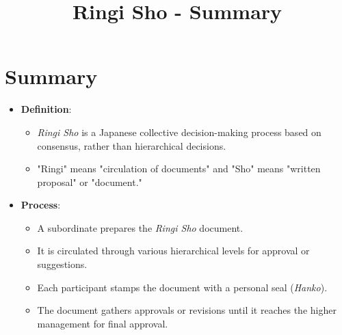 \documentclass{article}
\begin{document}
\title{Ringi Sho - Summary}
\author{}
\date{}

\maketitle

\section*{Summary}

\begin{itemize}
    \item \textbf{Definition}:
    \begin{itemize}
        \item \textit{Ringi Sho} is a Japanese collective decision-making process based on consensus, rather than hierarchical decisions.
        \item "Ringi" means "circulation of documents" and "Sho" means "written proposal" or "document."
    \end{itemize}

    \item \textbf{Process}:
    \begin{itemize}
        \item A subordinate prepares the \textit{Ringi Sho} document.
        \item It is circulated through various hierarchical levels for approval or suggestions.
        \item Each participant stamps the document with a personal seal (\textit{Hanko}).
        \item The document gathers approvals or revisions until it reaches the higher management for final approval.
    \end{itemize}


\end{itemize}
\end{document}
